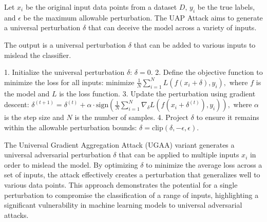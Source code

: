 Let \( x_i \) be the original input data points from a dataset \( D \), \( y_i \) be the true labels, and \( \epsilon \) be the maximum allowable perturbation. The UAP Attack aims to generate a universal perturbation \( \delta \) that can deceive the model across a variety of inputs.

The output is a universal perturbation $\delta$ that can be added to various inputs to mislead the classifier.


1. Initialize the universal perturbation \( \delta \):
   $
   \delta = 0.
   $
2. Define the objective function to minimize the loss for all inputs:
   $
   \text{minimize } \frac{1}{N} \sum_{i=1}^N L(f(x_i + \delta), y_i),
   $
   where \( f \) is the model and \( L \) is the loss function.
3. Update the perturbation using gradient descent:
   $
   \delta^{(t+1)} = \delta^{(t)} + \alpha \cdot \text{sign} \left( \frac{1}{N} \sum_{i=1}^N \nabla_{\delta} L(f(x_i + \delta^{(t)}), y_i) \right),
   $
   where \( \alpha \) is the step size and \( N \) is the number of samples.
4. Project \( \delta \) to ensure it remains within the allowable perturbation bounds:
   $
   \delta = \text{clip}(\delta, -\epsilon, \epsilon).
   $

The Universal Gradient Aggregation Attack (UGAA) variant generates a universal adversarial perturbation \( \delta \) that can be applied to multiple inputs \( x_i \) in order to mislead the model. By optimizing \( \delta \) to minimize the average loss across a set of inputs, the attack effectively creates a perturbation that generalizes well to various data points. This approach demonstrates the potential for a single perturbation to compromise the classification of a range of inputs, highlighting a significant vulnerability in machine learning models to universal adversarial attacks.